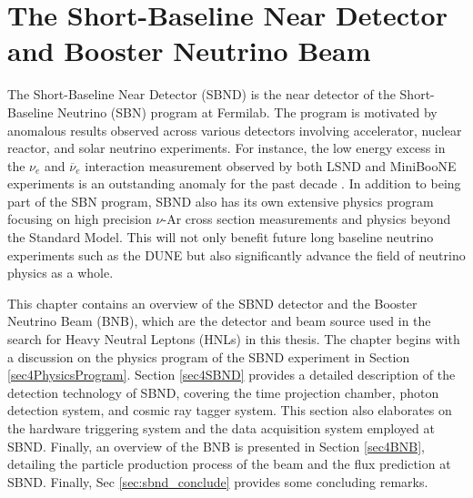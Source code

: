 \chapter{The Short-Baseline Near Detector and Booster Neutrino Beam}
\label{ChapterDetector}
\ifpdf
    \graphicspath{{Chapter4/Figs/Raster/}{Chapter4/Figs/PDF/}{Chapter4/Figs/}}
\else
    \graphicspath{{Chapter4/Figs/Vector/}{Chapter4/Figs/}}
\fi


The Short-Baseline Near Detector (SBND) is the near detector of the Short-Baseline Neutrino (SBN) program at Fermilab.
The program is motivated by anomalous results observed across various detectors involving accelerator, nuclear reactor, and solar neutrino experiments.
For instance, the low energy excess in the $\nu_e$ and $\overline{\nu}_e$ interaction measurement observed by both LSND and MiniBooNE experiments is an outstanding anomaly for the past decade \cite{LSND_anomaly, Miniboone_anomaly}.
In addition to being part of the SBN program, SBND also has its own extensive physics program focusing on high precision $\nu$-Ar cross section measurements and physics beyond the Standard Model. 
This will not only benefit future long baseline neutrino experiments such as the DUNE but also significantly advance the field of neutrino physics as a whole.

This chapter contains an overview of the SBND detector and the Booster Neutrino Beam (BNB), which are the detector and beam source used in the search for Heavy Neutral Leptons (HNLs) in this thesis.
The chapter begins with a discussion on the physics program of the SBND experiment in Section \ref{sec4PhysicsProgram}. 
Section \ref{sec4SBND} provides a detailed description of the detection technology of SBND, covering the time projection chamber, photon detection system, and cosmic ray tagger system. 
This section also elaborates on the hardware triggering system and the data acquisition system employed at SBND.
Finally, an overview of the BNB is presented in Section \ref{sec4BNB}, detailing the particle production process of the beam and the flux prediction at SBND.
Finally, Sec \ref{sec:sbnd_conclude} provides some concluding remarks.  


